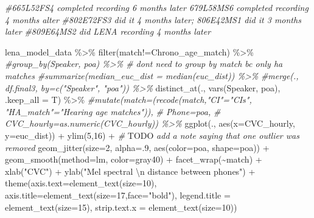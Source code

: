 \documentclass[
]{article}
\newenvironment{Shaded}{\begin{snugshade}}{\end{snugshade}}
\newcommand{\AlertTok}[1]{\textcolor[rgb]{0.94,0.16,0.16}{#1}}
\newcommand{\AttributeTok}[1]{\textcolor[rgb]{0.77,0.63,0.00}{#1}}
\newcommand{\CommentTok}[1]{\textcolor[rgb]{0.56,0.35,0.01}{\textit{#1}}}
\newcommand{\DecValTok}[1]{\textcolor[rgb]{0.00,0.00,0.81}{#1}}
\newcommand{\FunctionTok}[1]{\textcolor[rgb]{0.00,0.00,0.00}{#1}}
\newcommand{\NormalTok}[1]{#1}
\newcommand{\SpecialCharTok}[1]{\textcolor[rgb]{0.00,0.00,0.00}{#1}}
\newcommand{\StringTok}[1]{\textcolor[rgb]{0.31,0.60,0.02}{#1}}
\begin{document}
\begin{Shaded}
\begin{Highlighting}[]
\CommentTok{\#665L52FS4 completed recording 6 months later 679L58MS6 completed recording 4 months alter}
\CommentTok{\#802E72FS3 did it 4 months later; 806E42MS1 did it 3 months later}
\CommentTok{\#809E64MS2 did LENA recording 4 months later}

\NormalTok{lena\_model\_data }\SpecialCharTok{\%\textgreater{}\%}
  \FunctionTok{filter}\NormalTok{(match}\SpecialCharTok{!=}\StringTok{\textquotesingle{}Chrono\_age\_match\textquotesingle{}}\NormalTok{) }\SpecialCharTok{\%\textgreater{}\%}
   \CommentTok{\#group\_by(Speaker, poa) \%\textgreater{}\% \# don\textquotesingle{}t need to group by match bc only ha matches}
  \CommentTok{\#summarize(median\_euc\_dist = median(euc\_dist)) \%\textgreater{}\%}
  \CommentTok{\#merge(., df.final3, by=c("Speaker", "poa")) \%\textgreater{}\%}
  \FunctionTok{distinct\_at}\NormalTok{(., }\FunctionTok{vars}\NormalTok{(Speaker, poa), }\AttributeTok{.keep\_all =}\NormalTok{ T) }\SpecialCharTok{\%\textgreater{}\%}
  \CommentTok{\#mutate(match=(recode(match,"CI"="CIs", "HA\_match"="Hearing age matches")),}
   \CommentTok{\#      Phone=poa,}
    \CommentTok{\#     CVC\_hourly=as.numeric(CVC\_hourly)) \%\textgreater{}\%}
  \FunctionTok{ggplot}\NormalTok{(., }\FunctionTok{aes}\NormalTok{(}\AttributeTok{x=}\NormalTok{CVC\_hourly, }\AttributeTok{y=}\NormalTok{euc\_dist)) }\SpecialCharTok{+} 
  \FunctionTok{ylim}\NormalTok{(}\DecValTok{5}\NormalTok{,}\DecValTok{16}\NormalTok{) }\SpecialCharTok{+} \CommentTok{\# }\AlertTok{TODO}\CommentTok{ add a note saying that one outlier was removed}
  \FunctionTok{geom\_jitter}\NormalTok{(}\AttributeTok{size=}\DecValTok{2}\NormalTok{, }\AttributeTok{alpha=}\NormalTok{.}\DecValTok{9}\NormalTok{, }\FunctionTok{aes}\NormalTok{(}\AttributeTok{color=}\NormalTok{poa, }\AttributeTok{shape=}\NormalTok{poa)) }\SpecialCharTok{+} 
  \FunctionTok{geom\_smooth}\NormalTok{(}\AttributeTok{method=}\StringTok{\textquotesingle{}lm\textquotesingle{}}\NormalTok{, }\AttributeTok{color=}\StringTok{\textquotesingle{}gray40\textquotesingle{}}\NormalTok{) }\SpecialCharTok{+}
  \FunctionTok{facet\_wrap}\NormalTok{(}\SpecialCharTok{\textasciitilde{}}\NormalTok{match) }\SpecialCharTok{+}
  \FunctionTok{xlab}\NormalTok{(}\StringTok{"CVC"}\NormalTok{) }\SpecialCharTok{+} 
  \FunctionTok{ylab}\NormalTok{(}\StringTok{"Mel spectral }\SpecialCharTok{\textbackslash{}n}\StringTok{ distance between phones"}\NormalTok{) }\SpecialCharTok{+} 
  \FunctionTok{theme}\NormalTok{(}\AttributeTok{axis.text=}\FunctionTok{element\_text}\NormalTok{(}\AttributeTok{size=}\DecValTok{10}\NormalTok{),}
      \AttributeTok{axis.title=}\FunctionTok{element\_text}\NormalTok{(}\AttributeTok{size=}\DecValTok{17}\NormalTok{,}\AttributeTok{face=}\StringTok{"bold"}\NormalTok{),}
      \AttributeTok{legend.title =} \FunctionTok{element\_text}\NormalTok{(}\AttributeTok{size=}\DecValTok{15}\NormalTok{),}
      \AttributeTok{strip.text.x =} \FunctionTok{element\_text}\NormalTok{(}\AttributeTok{size=}\DecValTok{10}\NormalTok{)) }
\end{Highlighting}
\end{Shaded}
\end{document}
